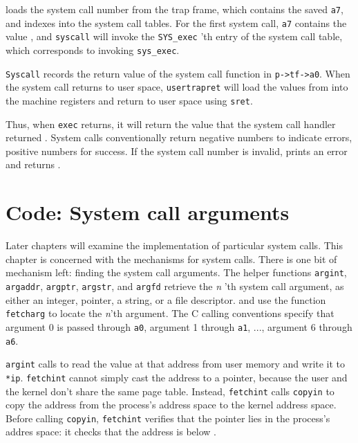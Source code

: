 loads the system call number from the trap frame, which
contains the saved
\texttt{a7},
and indexes into the system call tables.
For the first system call, 
\texttt{a7}
contains the value 
,
and
\lstinline{syscall}
will invoke the 
\lstinline{SYS_exec} 'th 
entry of the system call table, which corresponds to invoking
\lstinline{sys_exec}.

\lstinline{Syscall}
records the return value of the system call function in
\lstinline{p->tf->a0}.
When the system call returns to user space,
\lstinline{usertrapret}
will load the values
from
into the machine registers
and return to user space
using
\lstinline{sret}.

Thus, when 
\lstinline{exec}
returns, it will return the value
that the system call handler returned
.
System calls conventionally return negative numbers to indicate
errors, positive numbers for success.
If the system call number is invalid,
prints an error and returns .

\section{Code: System call arguments}

Later chapters will examine the implementation of
particular system calls.
This chapter is concerned with the mechanisms for system calls.
There is one bit of mechanism left: finding the system call arguments.
The helper functions
\lstinline{argint},
\lstinline{argaddr},
\lstinline{argptr},
\lstinline{argstr},
and
\lstinline{argfd}
retrieve the 
\textit{n} 'th 
system call
argument, as either an integer, pointer, a string, or a file descriptor.
and
use the function
\lstinline{fetcharg}
to locate the
\textit{n}'th 
argument. The C calling conventions specify that argument 0 is passed
through
\texttt{a0},
argument 1 through
\texttt{a1}, ...,
argument 6 through
\texttt{a6}.

\lstinline{argint} 
calls 
to read the value at that address from user memory and write it to
\lstinline{*ip}.  
\lstinline{fetchint}
cannot simply cast the address to a pointer, because the user and the
kernel don't share the same page table. Instead,
\lstinline{fetchint} calls \lstinline{copyin} to copy the address from the
process's address space to the kernel address space.  Before
calling \lstinline{copyin}, \lstinline{fetchint}
verifies that the
pointer lies in the process's addres
space: it checks
that the address is below
.

